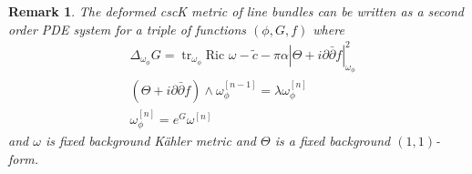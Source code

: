 \documentclass[10pt, letterpaper]{amsart}
\newcommand{\tr}{\operatorname{tr}}
\theoremstyle{plain}
\newtheorem{remark}[theorem]{Remark}
\theoremstyle{definition}
\numberwithin{equation}{section}
\begin{document}
\begin{remark}
	The deformed cscK metric of line bundles can be written as a second order PDE system for a triple of functions $\left(\phi, G,f\right)$ where 
	\begin{align*}
	& \Delta_{\omega_\phi}G
	 = 
	\tr_{\omega_\phi} \text{Ric }\omega - \widetilde{c} - \pi\alpha \left|\Theta+i\partial\bar\partial f\right|_{\omega_\phi}^2 \\
	&\left(\Theta+i\partial\bar\partial f\right) \wedge \omega_\phi^{[n-1]} 
	 = \lambda \omega_\phi^{[n]}\\
	& \omega_\phi^{[n]}
	 = e^G \omega^{[n]}
	\end{align*}
	and $\omega$ is fixed background K\"ahler metric and $\Theta$ is a fixed background $(1,1)$-form. 
\end{remark}
\end{document}
